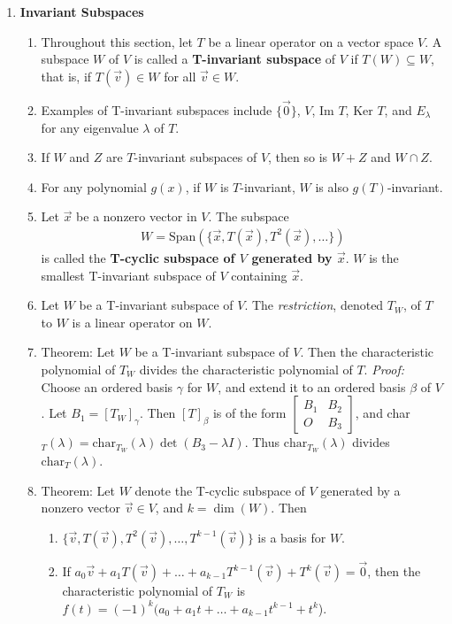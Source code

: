 \documentclass[10pt]{article}
\begin{document}
\begin{multicols*}{2}
\begin{enumerate}
    \item \textbf{Invariant Subspaces}
    \begin{enumerate}
        \item Throughout this section, let $T$ be a linear operator on a vector space $V$. A subspace $W$ of $V$ is called a \textbf{T-invariant subspace} of $V$ if $T(W) \subseteq W$, that is, if $T(\vec{v}) \in W$ for all $\vec{v} \in W$.
        \item Examples of T-invariant subspaces include $\{ \vec{0} \}$, $V$, Im $T$, Ker $T$, and $E_\lambda$ for any eigenvalue $\lambda$ of $T$.
        \item If $W$ and $Z$ are $T$-invariant subspaces of $V$, then so is $W+Z$ and $W \cap Z$.
        \item For any polynomial $g(x)$, if $W$ is $T$-invariant, $W$ is also $g(T)$-invariant.
        \item Let $\vec{x}$ be a nonzero vector in $V$. The subspace 
        \begin{align*}
            W = \text{Span}(\{ \vec{x}, T(\vec{x}), T^2(\vec{x}), \hdots \})
        \end{align*}
        is called the \textbf{T-cyclic subspace of $V$ generated by $\vec{x}$}. $W$ is the smallest T-invariant subspace of $V$ containing $\vec{x}$.
        \item Let $W$ be a T-invariant subspace of $V$. The \textit{restriction}, denoted $T_W$, of $T$ to $W$ is a linear operator on $W$. 
        \item Theorem: Let $W$ be a T-invariant subspace of $V$. Then the characteristic polynomial of $T_W$ divides the characteristic polynomial of $T$. \textit{Proof:} Choose an ordered basis $\gamma$ for $W$, and extend it to an ordered basis $\beta$ of $V$. Let $B_1 = [T_W]_\gamma$. Then $[T]_\beta$ is of the form $\begin{bmatrix} B_1 & B_2 \\ O & B_3 \end{bmatrix}$, and char$_T(\lambda) = \text{char}_{T_W}(\lambda) \det(B_3-\lambda I)$. Thus $\text{char}_{T_W}(\lambda)$ divides $\text{char}_{T}(\lambda)$.
        \item Theorem: Let $W$ denote the T-cyclic subspace of $V$ generated by a nonzero vector $\vec{v} \in V$, and $k = \dim(W)$. Then
        \begin{enumerate}
            \item $\{ \vec{v}, T(\vec{v}), T^2(\vec{v}), \hdots, T^{k-1}(\vec{v}) \}$ is a basis for $W$.
            \item If $a_0\vec{v} + a_1T(\vec{v}) + \hdots + a_{k-1}T^{k-1}(\vec{v}) + T^k(\vec{v}) = \vec{0}$, then the characteristic polynomial of $T_W$ is $f(t) = (-1)^k(a_0 + a_1t + \hdots + a_{k-1}t^{k-1} + t^k$).

\end{enumerate}
\end{enumerate}
\end{enumerate}
\end{multicols*}
\end{document}
